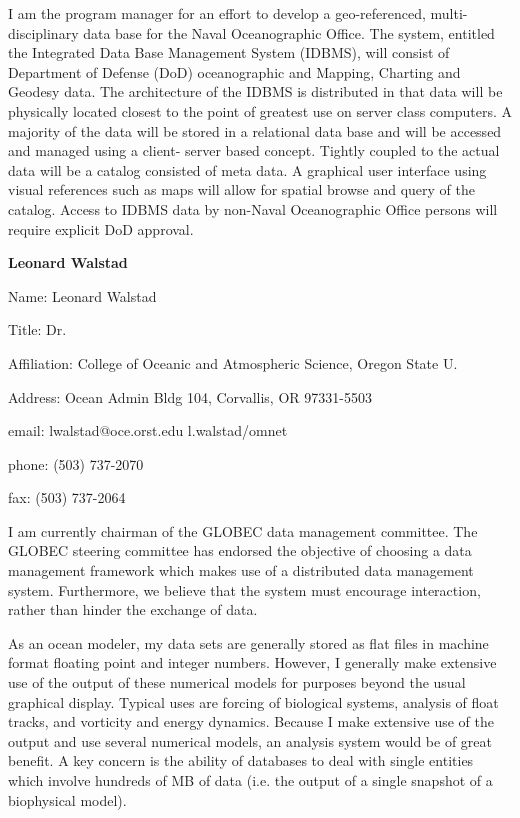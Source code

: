 \medskip
\large
{}
\normalsize
\medskip

	I am the program manager for an effort to develop a geo-referenced, 
multi-disciplinary data base for the Naval Oceanographic Office.  The 
system, entitled the Integrated Data Base Management System (IDBMS), 
will consist of Department of Defense (DoD) oceanographic and Mapping, 
Charting and Geodesy data.  The architecture of the IDBMS is distributed in 
that data will be physically located closest to the point of greatest use on 
server class computers.  A majority of the data will be stored in a 
relational data base and will be accessed and managed using a client-
server based concept.  Tightly coupled to the actual data will be a catalog 
consisted of meta data.  A graphical user interface using visual references 
such as maps will allow for spatial browse and query of the catalog.  
Access to IDBMS data by non-Naval Oceanographic Office persons will 
require explicit DoD approval.
\newpage

\begin{center}
\LARGE
{\bf  Leonard Walstad}
\end{center}
\large
{}
\normalsize
\smallskip
\begin{description}
\item{Name:}  Leonard Walstad
\item{Title:}  Dr.
\item{Affiliation:}  College of Oceanic and Atmospheric Science, Oregon 
State U.
\item{Address:}  Ocean Admin Bldg 104, Corvallis, OR  97331-5503  
\item{email:}  lwalstad@oce.orst.edu  l.walstad/omnet
\item{phone:}  (503) 737-2070
\item{fax:}  (503) 737-2064
\end{description}

\medskip
\large
{}
\normalsize
\medskip

	I am currently chairman of the GLOBEC data management committee.  
The GLOBEC steering committee has endorsed the objective of choosing a 
data management framework which makes use of a distributed data 
management system.  Furthermore, we believe that the system must 
encourage interaction, rather than hinder the exchange of data.  

	As an ocean modeler, my data sets are generally stored as flat files 
in machine format floating point and integer numbers.  However, I 
generally make extensive use of the output of these numerical models for 
purposes beyond the usual graphical display.  Typical uses are forcing of 
biological systems,  analysis of float tracks, and vorticity and energy 
dynamics.  Because I make extensive use of the output and use several 
numerical models, an analysis system would be of great benefit.  A key 
concern is the ability of databases to deal with single entities which 
involve hundreds of MB of data (i.e. the output of a single snapshot of a 
biophysical model).

